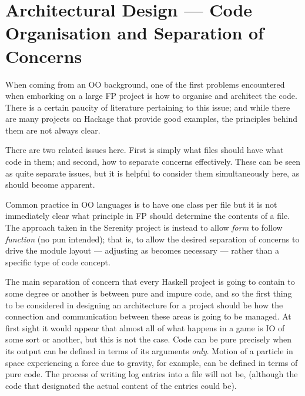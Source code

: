 \section{Architectural Design --- Code Organisation and  Separation of Concerns}
\label{sec:architecture}


When coming from an OO background, one of the first problems encountered when embarking on a large FP project is how to organise and architect the code. There is a certain paucity of literature pertaining to this issue; and while there are many projects on Hackage that provide good examples, the principles behind them are not always clear.

There are two related issues here. First is simply what files should have what code in them; and second, how to separate concerns effectively. These can be seen as quite separate issues, but it is helpful to consider them simultaneously here, as should become apparent.

Common practice in OO languages is to have one class per file but it is not immediately clear what principle in FP should determine the contents of a file. The approach taken in the Serenity project is instead to allow \emph{form} to follow \emph{function} (no pun intended); that is, to allow the desired separation of concerns to drive the module layout --- adjusting as becomes necessary --- rather than a specific type of code concept.

The main separation of concern that every Haskell project is going to contain to some degree or another is between pure and impure code, and so the first thing to be considered in designing an architecture for a project should be how the connection and communication between these areas is going to be managed.
At first sight it would appear that almost all of what happens in a game is IO of some sort or another, but this is not the case. Code can be pure precisely when its output can be defined in terms of its arguments \emph{only}. Motion of a particle in space experiencing a force due to gravity, for example, can be defined in terms of pure code. The process of writing log entries into a file will not be, (although the code that designated the actual content of the entries could be).

